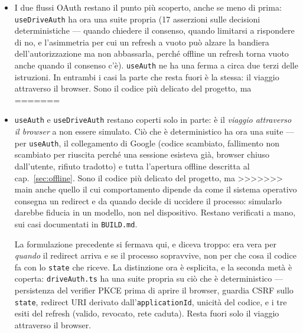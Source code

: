 \documentclass[11pt,a4paper]{report}
\begin{document}
\begin{itemize}[nosep]
<<<<<<< HEAD
  \item I due flussi OAuth restano il punto pi\`u scoperto, anche se meno di
        prima: \texttt{useDriveAuth} ha ora una suite propria (17 asserzioni
        sulle decisioni deterministiche --- quando chiedere il consenso, quando
        limitarsi a rispondere di no, e l'asimmetria per cui un refresh a vuoto
        pu\`o alzare la bandiera dell'autorizzazione ma non abbassarla, perch\'e
        offline un refresh torna vuoto anche quando il consenso c'\`e).
        \texttt{useAuth} ne ha una ferma a circa due terzi delle istruzioni. In
        entrambi i casi la parte che resta fuori \`e la stessa: il viaggio
        attraverso il browser. Sono il codice pi\`u delicato del progetto, ma
=======
  \item \texttt{useAuth} e \texttt{useDriveAuth} restano coperti solo in parte:
        \`e il \emph{viaggio attraverso il browser} a non essere simulato. Ci\`o
        che \`e deterministico ha ora una suite --- per \texttt{useAuth}, il
        collegamento di Google (codice scambiato, fallimento non scambiato per
        riuscita perch\'e una sessione esisteva gi\`a, browser chiuso
        dall'utente, rifiuto tradotto) e tutta l'apertura offline descritta al
        cap.~\ref{sec:offline}. Sono il codice pi\`u delicato del progetto, ma
>>>>>>> main
        anche quello il cui comportamento dipende da come il sistema operativo
        consegna un redirect e da quando decide di uccidere il processo:
        simularlo darebbe fiducia in un modello, non nel dispositivo. Restano
        verificati a mano, sui casi documentati in \texttt{BUILD.md}.

        La formulazione precedente si fermava qui, e diceva troppo: era vera
        per \emph{quando} il redirect arriva e se il processo sopravvive, non
        per che cosa il codice fa con lo \texttt{state} che riceve. La
        distinzione ora \`e esplicita, e la seconda met\`a \`e coperta:
        \texttt{driveAuth.ts} ha una suite propria su ci\`o che \`e
        deterministico --- persistenza del verifier PKCE prima di aprire il
        browser, guardia CSRF sullo \texttt{state}, redirect URI derivato
        dall'\texttt{applicationId}, unicit\`a del codice, e i tre esiti del
        refresh (valido, revocato, rete caduta). Resta fuori solo il viaggio
        attraverso il browser.


\end{itemize}
\end{document}
